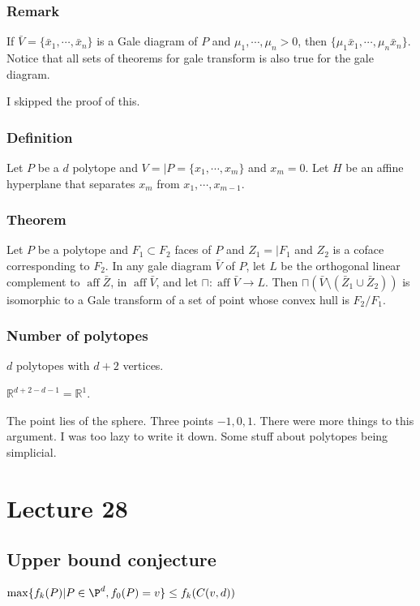 \documentclass[11pt]{article}
\def\R{\mathbb{R}}
\def\aff{\operatorname{aff}}
\begin{document}
{{{\subsubsection{Remark}
\label{sec:orgf9b6499}
If \(\bar{V} = \{\bar{x}_1, \cdots, \bar{x}_n\}\) is a Gale diagram of \(P\) and
\(\mu_1, \cdots, \mu_n > 0\), then \(\{\mu_1 \bar{x}_1, \cdots,
    \mu_n\bar{x}_n\}\). Notice that all sets of theorems for gale transform is
also true for the gale diagram.

I skipped the proof of this.
\subsubsection{Definition}
\label{sec:org5c15103}
Let \(P\) be a \(d\) polytope and \(V = \vert P = \{x_1, \cdots, x_m\}\) and \(x_m
    = 0\). Let \(H\) be an affine hyperplane that separates \(x_m\) from \(x_1,
    \cdots, x_{m-1}\).
\subsubsection{Theorem}
\label{sec:orgf9c52d7}
Let \(P\) be a polytope and \(F_1 \subset F_2\) faces of \(P\) and \(Z_1 = \vert
    F_1\) and \(Z_2\) is a coface corresponding to \(F_2\). In any gale diagram
\(\bar{V}\) of \(P\), let \(L\) be the orthogonal linear complement to \(\aff
    \bar{Z}\), in \(\aff \bar{V}\), and let \(\sqcap\colon \aff \bar{V}\rightarrow
    L\). Then \(\sqcap(\bar{V} \setminus (\bar{Z}_1 \cup \bar{Z}_2))\) is
isomorphic to a Gale transform of a set of point whose convex hull is
\(F_2/F_1\).
\subsubsection{Number of polytopes}
\label{sec:org7135233}
\(d\) polytopes with \(d + 2\) vertices.

\(\R^{d + 2 - d - 1} = \R^1\).

The point lies of the sphere. Three points \(-1, 0, 1\). There were more
things to this argument. I was too lazy to write it down. Some stuff about
polytopes being simplicial.
\section{Lecture 28}
\label{sec:orgb44c76d}
\subsection{Upper bound conjecture}
\label{sec:orga3708fd}
\(\max \{f_k(P) \vert P \in \P^d, f_0(P) = v\} \le f_k(C(v, d))\)

}}}
\end{document}
